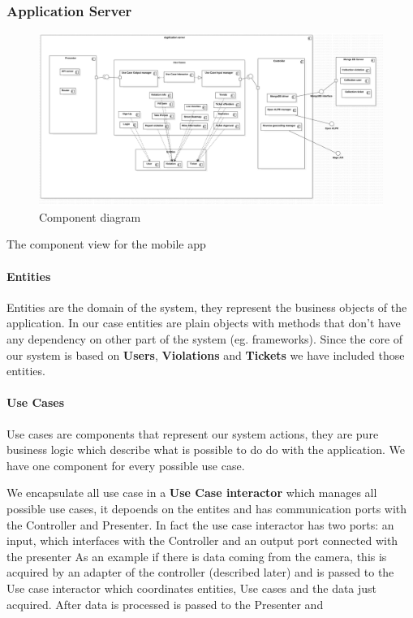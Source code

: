 
\subsubsection{Application Server} \label{API}
\begin{figure}
\centering
\includegraphics[width=\textwidth]{Images/ComponentDiagram2.png}
\caption{\label{fig:compdiag} Component diagram}
\end{figure}

The component view for the mobile app

\paragraph{Entities}
Entities are the domain of the system, they represent the business objects of the application. In our case entities are plain objects with methods that don't have any dependency on other part of the system (eg. frameworks).
Since the core of our system is based on \textbf{Users}, \textbf{Violations} and \textbf{Tickets} we have included those entities.


\paragraph{Use Cases}
Use cases are components that represent our system actions, they are pure business logic which describe what is possible to do do with the application. We have one component for every possible use case.

We encapsulate all use case in a \textbf{Use Case interactor} which manages all possible use cases, it depoends on the entites and has communication ports with the Controller and Presenter.
In fact the use case interactor has two ports: an input, which interfaces with the Controller and an output port connected with the presenter
 As an example if there is data coming from the camera, this is acquired by an adapter of the controller (described later) and is passed to the Use case interactor which coordinates entities, Use cases and the data just acquired. After data is processed is passed to the Presenter and


